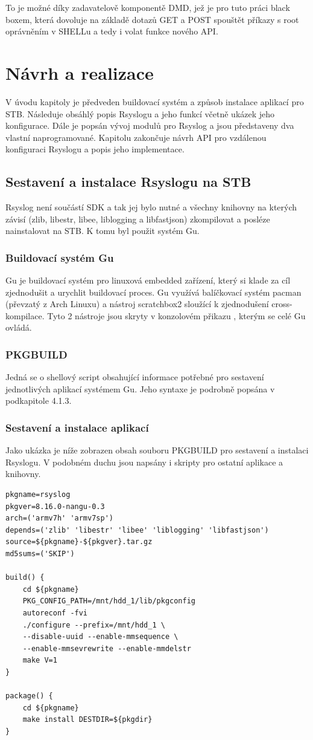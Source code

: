 \documentclass[thesis=B,czech]{FITthesis}[2012/06/26]
\begin{document}
To je možné díky zadavatelově komponentě DMD, jež je pro tuto práci black boxem, která dovoluje na základě dotazů GET a POST spouštět příkazy s root oprávněním v SHELLu a tedy i volat funkce nového API.

\chapter{Návrh a realizace}
V úvodu kapitoly je předveden buildovací systém a způsob instalace aplikací pro STB.
Následuje obsáhlý popis Rsyslogu a jeho funkcí včetně ukázek jeho konfigurace.
Dále je popsán vývoj modulů pro Rsyslog a jsou představeny dva vlastní naprogramované.
Kapitolu zakončuje návrh API pro vzdálenou konfiguraci Rsyslogu a popis jeho implementace.

\section{Sestavení a instalace Rsyslogu na STB}
Rsyslog není součástí SDK a tak jej bylo nutné a všechny knihovny na kterých závisí (zlib, libestr, libee, liblogging a libfastjson) zkompilovat a posléze nainstalovat na STB. K tomu byl použit systém Gu.

\subsection{Buildovací systém Gu}
Gu je buildovací systém pro linuxová embedded zařízení, který si klade za cíl zjednodušit a urychlit buildovací proces. Gu využívá balíčkovací systém pacman (převzatý z Arch Linuxu) a nástroj scratchbox2 sloužící k zjednodušení cross-kompilace. Tyto 2 nástroje jsou skryty v konzolovém přikazu , kterým se celé Gu ovládá.

\subsection{PKGBUILD}
Jedná se o shellový script obsahující informace potřebné pro sestavení jednotlivých aplikací systémem Gu. Jeho syntaxe je podrobně popsána v podkapitole 4.1.3.
\clearpage 

\subsection{Sestavení a instalace aplikací}
Jako ukázka je níže zobrazen obsah souboru PKGBUILD pro sestavení a instalaci Rsyslogu. V podobném duchu jsou napsány i skripty pro ostatní aplikace a knihovny.
\begin{lstlisting}[style=PKGBuildStyle]
pkgname=rsyslog
pkgver=8.16.0-nangu-0.3
arch=('armv7h' 'armv7sp')
depends=('zlib' 'libestr' 'libee' 'liblogging' 'libfastjson')
source=${pkgname}-${pkgver}.tar.gz
md5sums=('SKIP')

build() {
	cd ${pkgname}
	PKG_CONFIG_PATH=/mnt/hdd_1/lib/pkgconfig
	autoreconf -fvi
	./configure --prefix=/mnt/hdd_1 \
	--disable-uuid --enable-mmsequence \
	--enable-mmsevrewrite --enable-mmdelstr
	make V=1
}

package() {
	cd ${pkgname}
	make install DESTDIR=${pkgdir}
}
\end{lstlisting}
\end{document}
